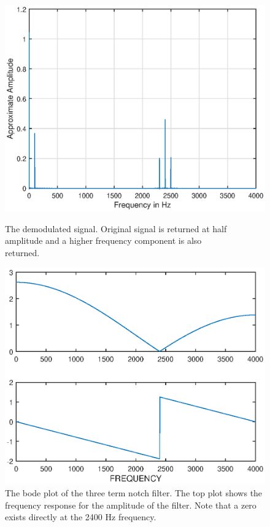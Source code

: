 \documentclass{article}
\begin{document}
\begin{figure}[H]
	\begin{minipage}[t]{0.45\linewidth}
		\centering
		\includegraphics[scale=0.5]{fig7.eps}
		\caption{The demodulated signal. Original signal is returned at half amplitude and a higher frequency component is also \\returned.}
	\end{minipage}
	\hspace{1cm}
	\begin{minipage}[t]{0.45\linewidth}
		\centering
		\includegraphics[scale=0.5]{fig8.eps}
		\caption{The bode plot of the three term notch filter. The top plot shows the frequency response for the amplitude of the filter. Note that a zero exists directly at the 2400 $\si{\hertz}$ frequency.}
	\end{minipage}
\end{figure}
\end{document}
